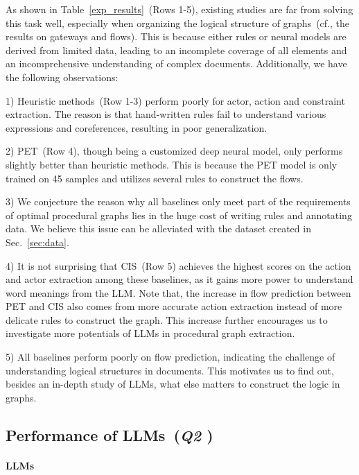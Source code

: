 As shown in Table~\ref{exp_results}~(Rows 1-5), existing studies are far from solving this task well, especially when organizing the logical structure of graphs~(cf., the results on gateways and flows). This is because either rules or neural models are derived from limited data, leading to an incomplete coverage of all elements and an incomprehensive understanding of complex documents. Additionally, we have the following observations: \par
%
1) Heuristic methods~(Row 1-3) perform poorly for actor, action and constraint extraction. The reason is that hand-written rules fail to understand various expressions and coreferences, resulting in poor generalization. \par
2) PET~(Row 4), though being a customized deep neural model, only performs slightly better than heuristic methods. This is because the PET model is only trained on 45 samples and utilizes several rules to construct the flows. \par
3)  We conjecture the reason why all baselines only meet part of the requirements of optimal procedural graphs lies in the huge cost of writing rules and annotating data. We believe this issue can be alleviated with the dataset created in Sec.~\ref{sec:data}.\par
4)  It is not surprising that CIS~(Row 5) achieves the highest scores on the action and actor extraction among these baselines, as it gains more power to understand word meanings from the LLM. Note that, the increase in flow prediction between PET and CIS also comes from more accurate action extraction instead of more delicate rules to construct the graph. This increase further encourages us to investigate more potentials of LLMs in procedural graph extraction. \par
5)  All baselines perform poorly on flow prediction, indicating the challenge of understanding logical structures in documents. This motivates us to find out, besides an in-depth study of LLMs, what else matters to construct the logic in graphs.
%

\subsection{Performance of LLMs~(\textit{Q2
}
)}

\paragraph{LLMs}

